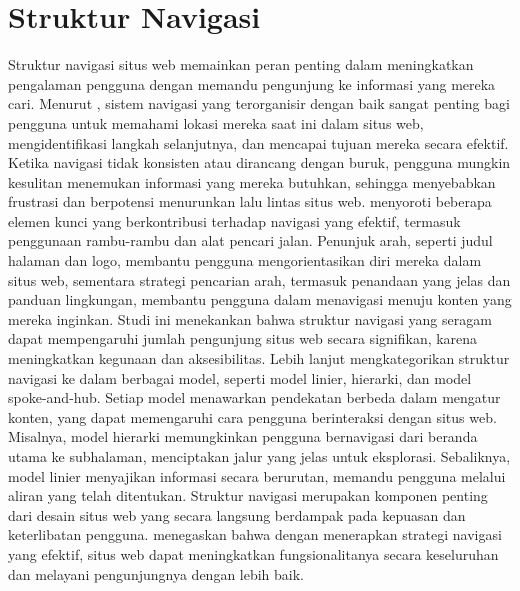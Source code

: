 \section{Struktur Navigasi}
Struktur navigasi situs web memainkan peran penting dalam meningkatkan pengalaman pengguna dengan memandu pengunjung ke informasi yang mereka cari. Menurut \citet{dewiyana2018website}, sistem navigasi yang terorganisir dengan baik sangat penting bagi pengguna untuk memahami lokasi mereka saat ini dalam situs web, mengidentifikasi langkah selanjutnya, dan mencapai tujuan mereka secara efektif. Ketika navigasi tidak konsisten atau dirancang dengan buruk, pengguna mungkin kesulitan menemukan informasi yang mereka butuhkan, sehingga menyebabkan frustrasi dan berpotensi menurunkan lalu lintas situs web.\@ \citet{dewiyana2018website} menyoroti beberapa elemen kunci yang berkontribusi terhadap navigasi yang efektif, termasuk penggunaan rambu-rambu dan alat pencari jalan. Penunjuk arah, seperti judul halaman dan logo, membantu pengguna mengorientasikan diri mereka dalam situs web, sementara strategi pencarian arah, termasuk penandaan yang jelas dan panduan lingkungan, membantu pengguna dalam menavigasi menuju konten yang mereka inginkan. Studi ini menekankan bahwa struktur navigasi yang seragam dapat mempengaruhi jumlah pengunjung situs web secara signifikan, karena meningkatkan kegunaan dan aksesibilitas.
\singlespacing{}
Lebih lanjut \citet{dewiyana2018website} mengkategorikan struktur navigasi ke dalam berbagai model, seperti model linier, hierarki, dan model spoke-and-hub. Setiap model menawarkan pendekatan berbeda dalam mengatur konten, yang dapat memengaruhi cara pengguna berinteraksi dengan situs web. Misalnya, model hierarki memungkinkan pengguna bernavigasi dari beranda utama ke subhalaman, menciptakan jalur yang jelas untuk eksplorasi. Sebaliknya, model linier menyajikan informasi secara berurutan, memandu pengguna melalui aliran yang telah ditentukan.
\singlespacing{}
Struktur navigasi merupakan komponen penting dari desain situs web yang secara langsung berdampak pada kepuasan dan keterlibatan pengguna.\@ \citet{dewiyana2018website} menegaskan bahwa dengan menerapkan strategi navigasi yang efektif, situs web dapat meningkatkan fungsionalitanya secara keseluruhan dan melayani pengunjungnya dengan lebih baik.

